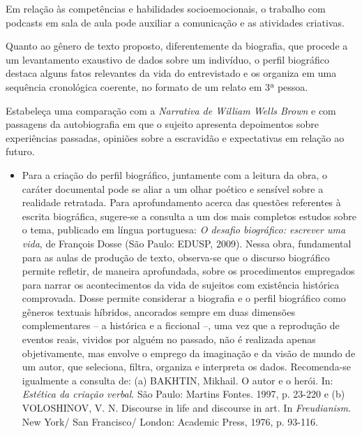 \documentclass[11pt]{extarticle}
\begin{document}
Em relação às competências e habilidades socioemocionais, o trabalho com
podcasts em sala de aula pode auxiliar a comunicação e as atividades
criativas.

Quanto ao gênero de texto proposto, diferentemente da biografia, que
procede a um levantamento exaustivo de dados sobre um indivíduo, o
perfil biográfico destaca alguns fatos relevantes da vida do
entrevistado e os organiza em uma sequência cronológica coerente, no
formato de um relato em 3ª pessoa.

Estabeleça uma comparação com a \emph{Narrativa de William Wells Brown}
e com passagens da autobiografia em que o sujeito apresenta depoimentos
sobre experiências passadas, opiniões sobre a escravidão e expectativas
em relação ao futuro.

\begin{itemize}
\item
  Para a criação do perfil biográfico, juntamente com a leitura da obra,
  o caráter documental pode se aliar a um olhar poético e sensível sobre
  a realidade retratada. Para aprofundamento acerca das questões
  referentes à escrita biográfica, sugere-se a consulta a um dos mais
  completos estudos sobre o tema, publicado em língua portuguesa:
  \emph{O desafio biográfico: escrever uma vida}, de François Dosse (São
  Paulo: EDUSP, 2009). Nessa obra, fundamental para as aulas de produção
  de texto, observa-se que o discurso biográfico permite refletir, de
  maneira aprofundada, sobre os procedimentos empregados para narrar os
  acontecimentos da vida de sujeitos com existência histórica
  comprovada. Dosse permite considerar a biografia e o perfil biográfico
  como gêneros textuais híbridos, ancorados sempre em duas dimensões
  complementares -- a histórica e a ficcional --, uma vez que a
  reprodução de eventos reais, vividos por alguém no passado, não é
  realizada apenas objetivamente, mas envolve o emprego da imaginação e
  da visão de mundo de um autor, que seleciona, filtra, organiza e
  interpreta os dados. Recomenda-se igualmente a consulta de: (a)
  BAKHTIN, Mikhail. O autor e o herói. In: \emph{Estética da criação
  verbal}. São Paulo: Martins Fontes. 1997, p. 23-220 e (b) VOLOSHINOV,
  V. N. Discourse in life and discourse in art. In \emph{Freudianism}.
  New York/ San Francisco/ London: Academic Press, 1976, p. 93-116.
\end{itemize}

\end{document}

